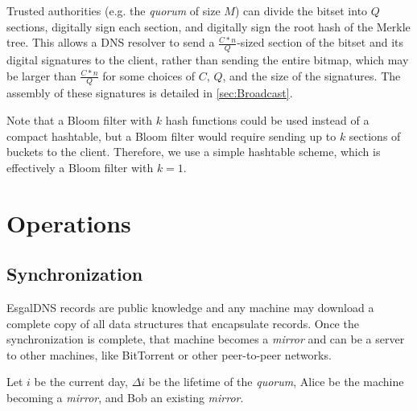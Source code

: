 Trusted authorities (e.g. the \emph{quorum} of size $ M $) can divide the bitset into $ Q $ sections, digitally sign each section, and digitally sign the root hash of the Merkle tree. This allows a DNS resolver to send a $ \frac{C * n}{Q} $-sized section of the bitset and its digital signatures to the client, rather than sending the entire bitmap, which may be larger than $ \frac{C * n}{Q} $ for some choices of $ C $, $ Q $, and the size of the signatures. The assembly of these signatures is detailed in \ref{sec:Broadcast}.

Note that a Bloom filter with $ k $ hash functions could be used instead of a compact hashtable, but a Bloom filter would require sending up to $ k $ sections of buckets to the client. Therefore, we use a simple hashtable scheme, which is effectively a Bloom filter with $ k = 1 $.




\section{Operations}
\label{sec:Operations}

\subsection{Synchronization}
\label{sec:Synchronization}

EsgalDNS records are public knowledge and any machine may download a complete copy of all data structures that encapsulate records. Once the synchronization is complete, that machine becomes a \emph{mirror} and can be a server to other machines, like BitTorrent or other peer-to-peer networks.

Let $ i $ be the current day, $ \Delta i $ be the lifetime of the \emph{quorum}, Alice be the machine becoming a \emph{mirror}, and Bob an existing \emph{mirror}. 

